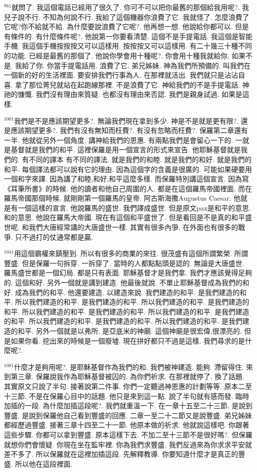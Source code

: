 \documentclass{book}
\begin{document}
$^{961}$就問了.
我這個電話已經用了很久了.
你可不可以把你最舊的那個給我用呢?.
我兒子說不行.
不知為何說不行.
我給了這個機器你浪費了它.
我就怪了.
怎麼浪費了它呢?你不給就不給.
為什麼要說浪費了它呢?.
他再想一想.
他說給你都可以.
但是有條件的.
有什麼條件呢?.
他說第一你要看清楚.
這個不是手提電話.
我這個是智能手機.
我這個手機按按按又可以這樣用.
按按按又可以這樣用.
有二十幾三十種不同的功能.
已經是最舊的那個了.
他說你學會用十種呢?.
你會用十種我就給你.
如果不是.
我給了你.
你當手提電話用.
浪費了它.
弟兄姊妹.
神為我們所預備的.
叫我們在一個新的好的生活裡面.
要安排我們行事為人.
在那裡就活出.
我們就只是沾沾自喜.
拿了那位菁兒就站在起跑線那裡.
不是浪費了它.
神給我們的不是手提電話.
神祂的慷慨.
我們沒有理由來質疑.
也都沒有理由來否認.
我們是親身試過.
如果是這樣.

$^{1001}$我們是不是應該期望更多?.
無論我們現在拿到多少.
神是不是就是更有限?.
還是應該期望更多?.
我們有沒有無知而枉費?.
有沒有忽略而枉費?.
保羅第二章還有一半.
他就從另外一個角度.
講神給我們的恩惠.
有兩點我們是會留心一下的.
一就是基督就是我們的和平.
這裡保羅是用一個宣言的形式來宣告.
他耶穌基督就是我們的.
有不同的譯本 有不同的譯法.
就是我們的和睦.
就是我們的和好.
就是我們的和平.
每個譯法都可以說有它的理由.
因為這個字的含義是很廣的.
可能如果硬要用一個和字來譯.
因為講了和睦,和好,和平這麼多樣.
而保羅特別講這個宣言.
因為寫《耳筆所書》的時候.
他的讀者和他自己周圍的人.
都是在這個羅馬帝國裡面.
而在羅馬帝國那個時候.
就剛剛第一個羅馬的皇帝.
阿古斯海撒Augustus Caesar.
他就是有一個這樣的宣言.
他說羅馬的盛世.
我們譯成盛世.
但是原文pax是和平的意思.
和的意思.
他說在羅馬大帝國.
現在有這個和平盛世了.
但是看回是不是真的和平盛世呢.
和我們大唐經常講的大唐盛世一樣.
其實有很多內爭.
在外面也有很多的戰爭.
只不過打的仗通常都是贏.

$^{1041}$用這個霸權來鎮壓到.
所以有很多的商業的來往.
很茂盛有這個所謂繁榮.
所謂豐盛.
但是保羅一句拆穿.
一拆穿了.
當時的人都點點頭是認的.
無論是大唐盛世.
羅馬盛世都是一個幻局.
都是只有表面.
耶穌基督才是我們拿.
我們才應該覺得足夠的.
這個和好.
另外一個就是講到建造.
他最後就說.
不單止耶穌基督成為我們的和好.
成為我們的和平.
他還要建造.
以建造來說.
我們建造的和平.
是我們建造的和平.
所以我們建造的和平.
是我們建造的和平.
所以我們建造的和平.
是我們建造的和平.
所以我們建造的和平.
是我們建造的和平.
所以我們建造的和平.
是我們建造的和平.
所以我們建造的和平.
是我們建造的和平.
所以我們建造的和平.
是我們建造的和平.
另外一個就是以弗所.
是亞底米的神廟.
這個神廟是很宏偉,很漂亮的.
但是如果你看.
挖出來的時候是一個廢墟.
現在拼好都只不過是這樣.
我們尋求的是什麼呢?.

$^{1081}$什麼才是夠用呢?.
是耶穌基督作為我們的和.
我們被神建造.
能夠.
滯留得住.
來到第三章.
保羅說我作為耶穌基督被囚的.
為你們祈求.
在那裡就停了.
換了話題.
其實原文只說了半句.
接著說第二件事.
你們一定聽過神恩惠的計劃等等.
原本二至十三節.
不是在保羅心目中的話題.
他只是來到這一點.
說了半句就有感而發.
臨時加插的一段.
為什麼加插這段呢?.
我們就重溫一下.
在一章十五至二十三節.
是說到豐盛.
是說到保羅他自己看到豐盛的回應.
二章一至二十二節又是說豐盛.
弟兄姊妹都經歷過豐盛.
接著三章十四至二十一節.
他原本做的祈求.
他就說這樣吧.
你跟著這些步驟.
你都可以拿到豐盛.
原本這樣下去.
不加二至十三節不是很好嗎?.
但保羅就想你們會懷疑.
你現在坐在監牢裡.
你為我們求豐盛.
我們反過來為你求求平安就差不多了.
所以保羅就在這裡加插這段.
先解釋教導.
你要知道什麼才是真正的豐盛.
所以他在這段裡面.
\end{document}
